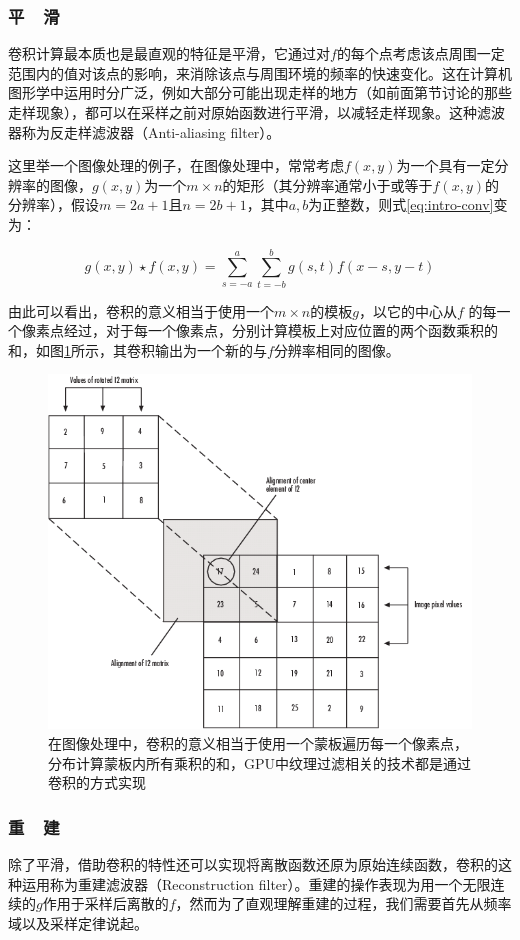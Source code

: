 \subsubsection{平~~滑}
卷积计算最本质也是最直观的特征是平滑，它通过对$f$的每个点考虑该点周围一定范围内的值对该点的影响，来消除该点与周围环境的频率的快速变化。这在计算机图形学中运用时分广泛，例如大部分可能出现走样的地方（如前面第节讨论的那些走样现象），都可以在采样之前对原始函数进行平滑，以减轻走样现象。这种滤波器称为反走样滤波器（Anti-aliasing filter）。


这里举一个图像处理的例子，在图像处理中，常常考虑$f(x,y)$为一个具有一定分辨率的图像，$g(x,y)$为一个$m\times n$的矩形（其分辨率通常小于或等于$f(x,y)$的分辨率），假设$m=2a+1$且$n=2b+1$，其中$a,b$为正整数，则式\ref{eq:intro-conv}变为：

\begin{equation}\label{eq:intro-convolution-2}
	g(x,y)\star f(x,y)=\sum^{a}_{s=-a}\sum^{b}_{t=-b}g(s,t)f(x-s,y-t)
\end{equation}

\noindent 由此可以看出，卷积的意义相当于使用一个$m\times n$的模板$g$，以它的中心从$f$ 的每一个像素点经过，对于每一个像素点，分别计算模板上对应位置的两个函数乘积的和，如图\ref{f:intro-conv}所示，其卷积输出为一个新的与$f$分辨率相同的图像。

\begin{figure}
\sidecaption
	\includegraphics[width=.5\textwidth]{figures/intro/conv}
	\caption{在图像处理中，卷积的意义相当于使用一个蒙板遍历每一个像素点，分布计算蒙板内所有乘积的和，GPU中纹理过滤相关的技术都是通过卷积的方式实现}
	\label{f:intro-conv}
\end{figure}





\subsubsection{重~~建}
除了平滑，借助卷积的特性还可以实现将离散函数还原为原始连续函数，卷积的这种运用称为重建滤波器（Reconstruction filter）。重建的操作表现为用一个无限连续的$g$作用于采样后离散的$f$，然而为了直观理解重建的过程，我们需要首先从频率域以及采样定律说起。

